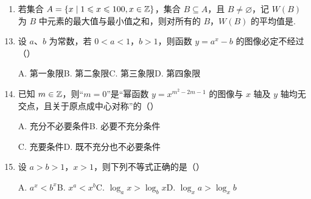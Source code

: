 \begin{enumerate}
\item 若集合 $A=\{x\mid1\leqslant x\leqslant100,x\in\mathbb{Z}\}$，集合 $B\subseteq A$，且 $B\ne\varnothing$，记 $W(B)$ 为 $B$ 中元素的最大值与最小值之和，则对所有的 $B$，$W(B)$ 的平均值是\blankline[4.4em].

\ifanswer
\solbegin
{}
\solend
\fi

\end{enumerate}


\begin{enumerate}
\setcounter{enumi}{12}

\item 设 $a$、$b$ 为常数，若 $0<a<1$，$b>1$，则函数 $y=a^x-b$ 的图像必定不经过\mbox{（\quad）}

\keepwithprev
A. 第一象限\qquad\qquad B. 第二象限\qquad\qquad C. 第三象限\qquad\qquad D. 第四象限

\ifanswer
\solbegin
{}
\solend
\fi

\item 已知 $m\in\mathbb{Z}$，则“$m=0$”是“幂函数 $y=x^{m^2-2m-1}$ 的图像与 $x$ 轴及 $y$ 轴均无交点，且关于原点成中心对称”的\mbox{（\quad）}

\keepwithprev
A. 充分不必要条件\qquad\qquad B. 必要不充分条件

C. 充要条件\qquad\qquad D. 既不充分也不必要条件

\ifanswer
\solbegin
{}
\solend
\fi

\item 设 $a>b>1$，$x>1$，则下列不等式正确的是\mbox{（\quad）}

\keepwithprev
A. $a^x<b^x$\qquad B. $x^a<x^b$\qquad C. $\log_a x>\log_b x$\qquad D. $\log_x a>\log_x b$

\ifanswer
\solbegin
{}
\solend
\fi


\end{enumerate}
